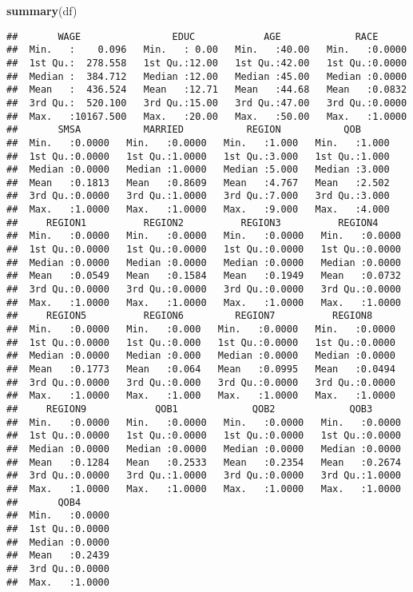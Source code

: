 \documentclass[
]{article}
\newenvironment{Shaded}{\begin{snugshade}}{\end{snugshade}}
\newcommand{\FunctionTok}[1]{\textcolor[rgb]{0.13,0.29,0.53}{\textbf{#1}}}
\newcommand{\NormalTok}[1]{#1}
\begin{document}
\begin{Shaded}
\begin{Highlighting}[]
\FunctionTok{summary}\NormalTok{(df)}
\end{Highlighting}
\end{Shaded}

\begin{verbatim}
##       WAGE                EDUC            AGE             RACE       
##  Min.   :    0.096   Min.   : 0.00   Min.   :40.00   Min.   :0.0000  
##  1st Qu.:  278.558   1st Qu.:12.00   1st Qu.:42.00   1st Qu.:0.0000  
##  Median :  384.712   Median :12.00   Median :45.00   Median :0.0000  
##  Mean   :  436.524   Mean   :12.71   Mean   :44.68   Mean   :0.0832  
##  3rd Qu.:  520.100   3rd Qu.:15.00   3rd Qu.:47.00   3rd Qu.:0.0000  
##  Max.   :10167.500   Max.   :20.00   Max.   :50.00   Max.   :1.0000  
##       SMSA           MARRIED           REGION           QOB       
##  Min.   :0.0000   Min.   :0.0000   Min.   :1.000   Min.   :1.000  
##  1st Qu.:0.0000   1st Qu.:1.0000   1st Qu.:3.000   1st Qu.:1.000  
##  Median :0.0000   Median :1.0000   Median :5.000   Median :3.000  
##  Mean   :0.1813   Mean   :0.8609   Mean   :4.767   Mean   :2.502  
##  3rd Qu.:0.0000   3rd Qu.:1.0000   3rd Qu.:7.000   3rd Qu.:3.000  
##  Max.   :1.0000   Max.   :1.0000   Max.   :9.000   Max.   :4.000  
##     REGION1          REGION2          REGION3          REGION4      
##  Min.   :0.0000   Min.   :0.0000   Min.   :0.0000   Min.   :0.0000  
##  1st Qu.:0.0000   1st Qu.:0.0000   1st Qu.:0.0000   1st Qu.:0.0000  
##  Median :0.0000   Median :0.0000   Median :0.0000   Median :0.0000  
##  Mean   :0.0549   Mean   :0.1584   Mean   :0.1949   Mean   :0.0732  
##  3rd Qu.:0.0000   3rd Qu.:0.0000   3rd Qu.:0.0000   3rd Qu.:0.0000  
##  Max.   :1.0000   Max.   :1.0000   Max.   :1.0000   Max.   :1.0000  
##     REGION5          REGION6         REGION7          REGION8      
##  Min.   :0.0000   Min.   :0.000   Min.   :0.0000   Min.   :0.0000  
##  1st Qu.:0.0000   1st Qu.:0.000   1st Qu.:0.0000   1st Qu.:0.0000  
##  Median :0.0000   Median :0.000   Median :0.0000   Median :0.0000  
##  Mean   :0.1773   Mean   :0.064   Mean   :0.0995   Mean   :0.0494  
##  3rd Qu.:0.0000   3rd Qu.:0.000   3rd Qu.:0.0000   3rd Qu.:0.0000  
##  Max.   :1.0000   Max.   :1.000   Max.   :1.0000   Max.   :1.0000  
##     REGION9            QOB1             QOB2             QOB3       
##  Min.   :0.0000   Min.   :0.0000   Min.   :0.0000   Min.   :0.0000  
##  1st Qu.:0.0000   1st Qu.:0.0000   1st Qu.:0.0000   1st Qu.:0.0000  
##  Median :0.0000   Median :0.0000   Median :0.0000   Median :0.0000  
##  Mean   :0.1284   Mean   :0.2533   Mean   :0.2354   Mean   :0.2674  
##  3rd Qu.:0.0000   3rd Qu.:1.0000   3rd Qu.:0.0000   3rd Qu.:1.0000  
##  Max.   :1.0000   Max.   :1.0000   Max.   :1.0000   Max.   :1.0000  
##       QOB4       
##  Min.   :0.0000  
##  1st Qu.:0.0000  
##  Median :0.0000  
##  Mean   :0.2439  
##  3rd Qu.:0.0000  
##  Max.   :1.0000
\end{verbatim}
\end{document}
